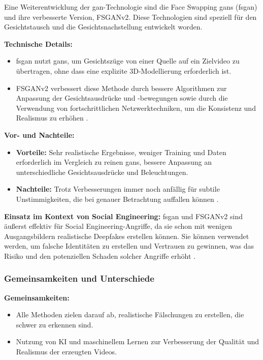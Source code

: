 Eine Weiterentwicklung der \gls{gan}-Technologie sind die Face Swapping \glspl{gan} (\gls{fsgan}) und ihre verbesserte Version, FSGANv2.
Diese Technologien sind speziell für den Gesichtstausch und die Gesichtsnachstellung entwickelt worden.

\textbf{Technische Details:}
\begin{itemize}
    \item \gls{fsgan} nutzt \glspl{gan}, um Gesichtszüge von einer Quelle auf ein Zielvideo zu übertragen, ohne dass eine explizite 3D-Modellierung erforderlich ist.
    \item FSGANv2 verbessert diese Methode durch bessere Algorithmen zur Anpassung der Gesichtsausdrücke und -bewegungen sowie durch die Verwendung von fortschrittlichen Netzwerktechniken, um die Konsistenz und Realismus zu erhöhen \cite{fsganv2}.
\end{itemize}

\textbf{Vor- und Nachteile:}
\begin{itemize}
    \item \textbf{Vorteile:} Sehr realistische Ergebnisse, weniger Training und Daten erforderlich im Vergleich zu reinen \glspl{gan}, bessere Anpassung an unterschiedliche Gesichtsausdrücke und Beleuchtungen.
    \item \textbf{Nachteile:} Trotz Verbesserungen immer noch anfällig für subtile Unstimmigkeiten, die bei genauer Betrachtung auffallen können \cite{face-swapping-and-reenactment}.
\end{itemize}

\textbf{Einsatz im Kontext von Social Engineering:} \gls{fsgan} und FSGANv2 sind äußerst effektiv für Social Engineering-Angriffe, da sie schon mit wenigen Ausgangsbildern realistische Deepfakes erstellen können.
Sie können verwendet werden, um falsche Identitäten zu erstellen und Vertrauen zu gewinnen, was das Risiko und den potenziellen Schaden solcher Angriffe erhöht \cite{deepfacelab}.

\subsubsection{Gemeinsamkeiten und Unterschiede}\label{subsubsec:gemeinsamkeiten-unterschiede}

\textbf{Gemeinsamkeiten:}
\begin{itemize}
    \item Alle Methoden zielen darauf ab, realistische Fälschungen zu erstellen, die schwer zu erkennen sind.
    \item Nutzung von KI und maschinellem Lernen zur Verbesserung der Qualität und Realismus der erzeugten Videos.
\end{itemize}

